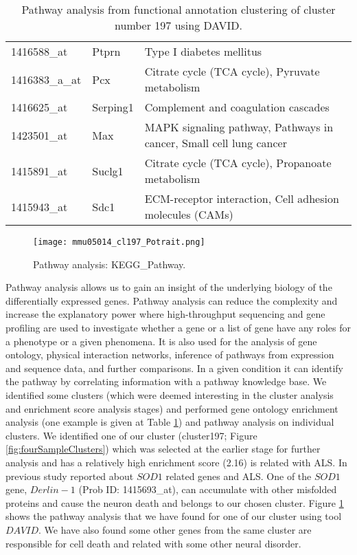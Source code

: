 \begin{table}
\begin{tabularx}{0.99\textwidth}{ l l X }
	1416588_at &	Ptprn	& Type I diabetes mellitus\\
	1416383_a_at &	Pcx	& Citrate cycle (TCA cycle), Pyruvate metabolism\\
	1416625_at &	Serping1	& Complement and coagulation cascades\\
	1423501_at &	Max	& MAPK signaling pathway, Pathways in cancer, Small cell lung cancer\\
	1415891_at &	Suclg1	& Citrate cycle (TCA cycle), Propanoate metabolism\\
	1415943_at &	Sdc1	& ECM-receptor interaction, Cell adhesion molecules (CAMs)\\
    \bottomrule
    \end{tabularx}
	  \caption[Pathway analysis from functional annotation clustering]
	  {Pathway analysis from functional annotation clustering of cluster number 197 using DAVID.
	  \label{table:funAnno}}
\end{table}


\begin{figure}
 \begin{center}
 \texttt{[image: mmu05014\_cl197\_Potrait.png]}
\caption {Pathway analysis: KEGG\_Pathway. \label{pathwayAnalysis}}
 \end{center}
\end{figure}
Pathway analysis allows us to gain an insight of the underlying biology of the differentially expressed genes. Pathway analysis can reduce the complexity and increase the explanatory power where high-throughput sequencing and gene profiling are used to investigate whether a gene or a list of gene have any roles for a phenotype or a given phenomena. It is also used for the analysis of gene ontology, physical interaction networks, inference of pathways from expression and sequence data, and further comparisons. In a given condition it can identify the pathway by correlating information with a pathway knowledge base. We identified some clusters (which were deemed interesting in the cluster analysis and enrichment score analysis stages) and performed gene ontology enrichment analysis (one example is given at Table \ref{table:funAnno}) and pathway analysis on individual clusters.  We identified one of our cluster (cluster197; Figure \ref{fig:fourSampleClusters}) which was selected at the earlier stage for further analysis and has a relatively high enrichment score (2.16) is related with ALS.  In previous study \cite{Brockington:2013} reported about $SOD1$ related genes and ALS.  One of the $SOD1$ gene, $Derlin-1$ (Prob ID: 1415693_at), can accumulate with other misfolded proteins and cause the neuron death and belongs to our chosen cluster. Figure \ref{pathwayAnalysis} shows the pathway analysis that we have found for one of our cluster using tool $DAVID$.  We have also found some other genes from the same cluster are responsible for cell death and related with some other neural disorder. 

